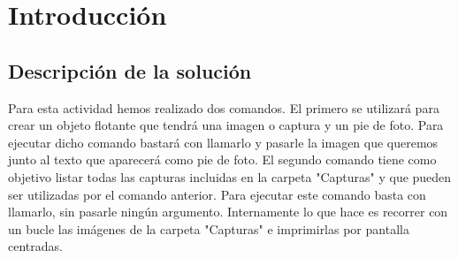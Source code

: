 
\chapter {Introducción}
\label{sec:intro}
\pagebreak
\section{Descripción de la solución}
Para esta actividad hemos realizado dos comandos. El primero se utilizará para crear un objeto flotante que tendrá una imagen o captura y un pie de foto. Para ejecutar dicho comando bastará con llamarlo y pasarle la imagen que queremos junto al texto que aparecerá como pie de foto. El segundo comando tiene como objetivo listar todas las capturas incluidas en la carpeta "Capturas" y que pueden ser utilizadas por el comando anterior. Para ejecutar este comando basta con llamarlo, sin pasarle ningún argumento. Internamente lo que hace es recorrer con un bucle las imágenes de la carpeta "Capturas" e imprimirlas por pantalla centradas. 
